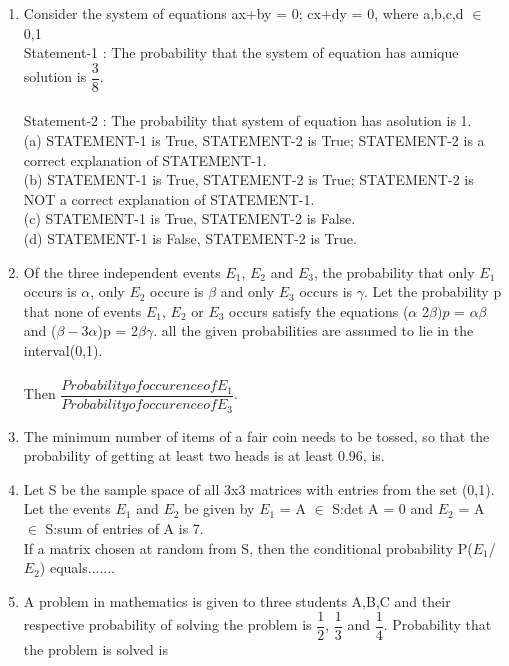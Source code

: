 \documentclass[journal,12pt,twocolumn]{IEEEtran}
\begin{document}
\begin{enumerate}[label=\arabic*]
	\item Consider the system of equations ax+by = 0; cx+dy = 0, where a,b,c,d $\in$ {0,1}\\
	Statement-1 : The probability that the system of equation has aunique solution is $\dfrac{3}{8}$.\\
	\\
	Statement-2 : The probability that system of equation has asolution is 1.\\
	(a) STATEMENT-1 is True, STATEMENT-2 is True; STATEMENT-2 is a correct explanation of STATEMENT-1.\\
	(b) STATEMENT-1 is True, STATEMENT-2 is True; STATEMENT-2 is NOT a correct explanation of STATEMENT-1.\\
	(c) STATEMENT-1 is True, STATEMENT-2 is False.\\
	(d) STATEMENT-1 is False, STATEMENT-2 is True.\\
	\item Of the three independent events $E_1$, $E_2$ and $E_3$, the probability that only $E_1$ occurs is $\alpha$, only $E_2$ occure is $\beta$ and only $E_3$ occurs is $\gamma$. Let the probability p that none of events $E_1$, $E_2$ or $E_3$ occurs satisfy the equations ($\alpha$  2$\beta)p$ = $\alpha\beta$ and ($\beta - 3\alpha$)p = 2$\beta\gamma$. all the given probabilities are assumed to lie in the interval(0,1).\\
	\\
	Then $\dfrac{Probability of occurence of E_1}{Probability of occurence of E_3}$.\\
	\item The minimum number of items of a fair coin needs to be tossed, so that the probability of getting at least two heads is at least 0.96, is.\\
	\item Let S be the sample space of all 3x3 matrices with entries from the set (0,1). Let the events $E_1$ and $E_2$ be given by $E_1$ = {A $\in$ S:det A = 0} and $E_2$ = {A $\in$ S:sum of entries of A is 7}.\\
	If a matrix chosen at random from S, then the conditional probability P($E_1$/$E_2$) equals.......\\
	\item A problem in mathematics is given to three students A,B,C and their respective probability of solving the problem is $\dfrac{1}{2}$, $\dfrac{1}{3}$ and $\dfrac{1}{4}$. Probability that the problem is solved is
	\begin{itemize}
	\begin{multicols}{4}

\end{multicols}
\end{itemize}
\end{enumerate}
\end{document}
